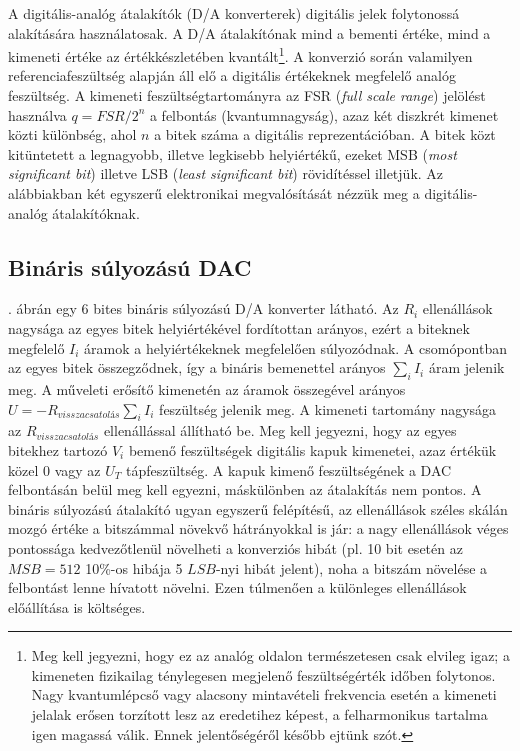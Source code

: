 \documentclass[12pt]{article}
\theoremstyle{plain}
\begin{document}
A digitális-analóg átalakítók (D/A konverterek) digitális jelek folytonossá alakítására használatosak. A D/A átalakítónak mind a bementi értéke, mind a kimeneti értéke az értékkészletében kvantált\footnote{Meg kell jegyezni, hogy ez az analóg oldalon természetesen csak elvileg igaz; a kimeneten fizikailag ténylegesen megjelenő feszültségérték időben folytonos. Nagy kvantumlépcső vagy alacsony mintavételi frekvencia esetén a kimeneti jelalak erősen torzított lesz az eredetihez képest, a felharmonikus tartalma igen magassá válik. Ennek jelentőségéről később ejtünk szót.}. A konverzió során valamilyen referenciafeszültség alapján áll elő a digitális értékeknek megfelelő analóg feszültség. A kimeneti feszültségtartományra az FSR (\textit{full scale range}) jelölést használva $q = FSR/2^n$ a felbontás (kvantumnagyság), azaz két diszkrét kimenet közti különbség, ahol $n$ a bitek száma a digitális reprezentációban. A bitek közt kitüntetett a legnagyobb, illetve legkisebb helyiértékű, ezeket MSB (\textit{most significant bit}) illetve LSB (\textit{least significant bit}) rövidítéssel illetjük.
Az alábbiakban két egyszerű elektronikai megvalósítását nézzük meg a digitális-analóg átalakítóknak.


\subsection{Bináris súlyozású DAC \cite{Bagoly}}

. ábrán egy 6 bites bináris súlyozású D/A konverter látható.
Az $R_i$ ellenállások nagysága az egyes bitek helyiértékével fordítottan arányos, ezért a biteknek megfelelő $I_i$ áramok a helyiértékeknek megfelelően súlyozódnak. A csomópontban az egyes bitek összegződnek, így a bináris bemenettel arányos $\sum_i I_i$ áram jelenik meg.
A műveleti erősítő kimenetén az áramok összegével arányos $U = - R_{visszacsatolás} \sum_i I_i$ feszültség jelenik meg. A kimeneti tartomány nagysága az $R_{visszacsatolás}$ ellenállással állítható be.
Meg kell jegyezni, hogy az egyes bitekhez tartozó $V_i$ bemenő feszültségek digitális kapuk kimenetei, azaz értékük közel 0 vagy az $U_T$ tápfeszültség. A kapuk kimenő feszültségének a DAC felbontásán belül meg kell egyezni, máskülönben az átalakítás nem pontos. A bináris súlyozású átalakító ugyan egyszerű felépítésű, az ellenállások széles skálán mozgó értéke a bitszámmal növekvő hátrányokkal is jár: a nagy ellenállások véges pontossága kedvezőtlenül növelheti a konverziós hibát (pl. 10 bit esetén az $MSB=512$ 10\%-os hibája 5 $LSB$-nyi hibát jelent), noha a bitszám növelése a felbontást lenne hívatott növelni. Ezen túlmenően a különleges ellenállások előállítása is költséges.
\end{document}
